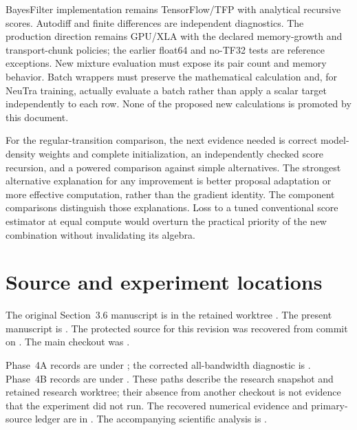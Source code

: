\documentclass[11pt]{article}
\begin{document}
BayesFilter implementation remains TensorFlow/TFP with analytical recursive
scores. Autodiff and finite differences are independent diagnostics. The
production direction remains GPU/XLA with the declared memory-growth and
transport-chunk policies; the earlier float64 and no-TF32 tests are reference
exceptions. New mixture evaluation must expose its pair count and memory
behavior. Batch wrappers must preserve the mathematical calculation and,
for NeuTra training, actually evaluate a batch rather than apply a scalar
target independently to each row. None of the proposed new calculations is
promoted by this document.

For the regular-transition comparison, the next evidence needed is correct
model-density weights and complete initialization, an independently checked
score recursion, and a powered comparison against simple alternatives. The
strongest alternative explanation for any improvement is better proposal
adaptation or more effective computation, rather than the gradient identity.
The component comparisons distinguish those explanations. Loss to a tuned
conventional score estimator at equal compute would overturn the practical
priority of the new combination without invalidating its algebra.


\appendix
\section{Source and experiment locations}

The original Section~3.6 manuscript is
in the retained worktree
.
The present manuscript is
.
The protected source for this revision was recovered from commit
 on
. The main checkout was
.

Phase~4A records are under
; the
corrected all-bandwidth diagnostic is
.
Phase~4B records are under
.
These paths describe the research snapshot and retained research worktree;
their absence from another checkout is not evidence that the experiment did
not run. The recovered numerical evidence and primary-source ledger are in
.
The accompanying scientific analysis is
.
\end{document}
